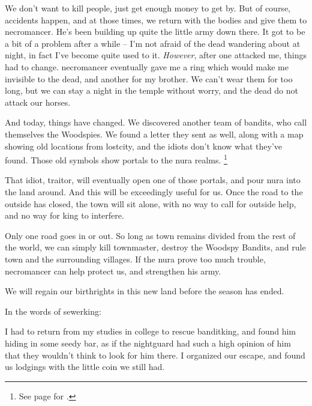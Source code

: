 \begin{multicols}{2}
\begin{exampletext}
  We don't want to kill people, just get enough money to get by.
  But of course, accidents happen, and at those times, we return with the bodies and give them to \gls{necromancer}.
  He's been building up quite the little army down there.
  It got to be a bit of a problem after a while -- I'm not afraid of the dead wandering about at night, in fact I've become quite used to it.
  \emph{However}, after one attacked me, things had to change.
  \gls{necromancer} eventually gave me a ring which would make me invisible to the dead, and another for my brother.
  We can't wear them for too long, but we can stay a night in the temple without worry, and the dead do not attack our horses.

  And today, things have changed.
  We discovered another team of bandits, who call themselves the Woodspies.
  We found a letter they sent as well, along with a map showing old locations from \gls{lostcity}, and the idiots don't know what they've found.
  Those old symbols show portals to the nura realms.%
  \footnote{See page \pageref{darknessandfire} for .}

  That idiot, \gls{traitor}, will eventually open one of those portals, and pour nura into the land around.
  And this will be exceedingly useful for us.
  Once the road to the outside has closed, the \gls{town} will sit alone, with no way to call for outside help, and no way for \gls{king} to interfere.

  Only one road goes in or out.
  So long as \gls{town} remains divided from the rest of the world, we can simply kill \gls{townmaster}, destroy the Woodspy Bandits, and rule \gls{town} and the surrounding villages.
  If the nura prove too much trouble, \gls{necromancer} can help protect us, and strengthen his army.

  We will regain our birthrights in this new land before the season has ended.

\end{exampletext}

In the words of \gls{sewerking}:

\begin{exampletext}

  I had to return from my studies in \gls{college} to rescue \gls{banditking}, and found him hiding in some seedy bar, as if the \gls{nightguard} had such a high opinion of him that they wouldn't think to look for him there.
  I organized our escape, and found us lodgings with the little coin we still had.


\end{exampletext}
\end{multicols}
